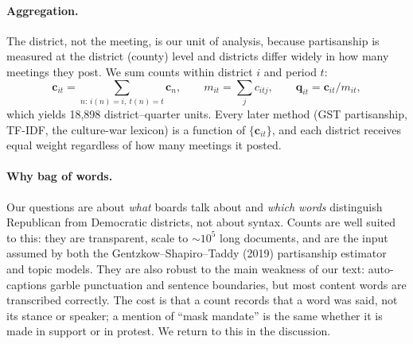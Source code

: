 \paragraph{Aggregation.} The district, not the meeting, is our unit of analysis, because
partisanship is measured at the district (county) level and districts differ widely in how many
meetings they post. We sum counts within district $i$ and period $t$:
\[
  \mathbf{c}_{it} = \sum_{n:\, i(n) = i,\ t(n) = t} \mathbf{c}_n, \qquad
  m_{it} = \sum_j c_{itj}, \qquad
  \mathbf{q}_{it} = \mathbf{c}_{it} / m_{it},
\]
which yields 18{,}898 district--quarter units. Every later method (GST partisanship, TF-IDF, the
culture-war lexicon) is a function of $\{\mathbf{c}_{it}\}$, and each district receives equal
weight regardless of how many meetings it posted.

\paragraph{Why bag of words.} Our questions are about \emph{what} boards talk about and
\emph{which words} distinguish Republican from Democratic districts, not about syntax. Counts
are well suited to this: they are transparent, scale to $\sim\!10^5$ long documents, and are the
input assumed by both the Gentzkow--Shapiro--Taddy (2019) partisanship estimator and topic
models. They are also robust to the main weakness of our text: auto-captions garble punctuation
and sentence boundaries, but most content words are transcribed correctly. The cost is that a
count records that a word was said, not its stance or speaker; a mention of ``mask mandate''
is the same whether it is made in support or in protest. We return to this in the discussion.
